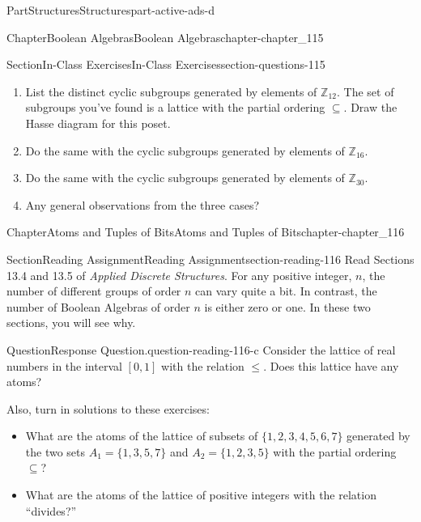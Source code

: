 \documentclass[oneside,10pt,]{book}
\numberwithin{equation}{section}
\begin{document}
\begin{partptx}{Part}{Structures}{}{Structures}{}{}{part-active-ads-d}
\begin{chapterptx}{Chapter}{Boolean Algebras}{}{Boolean Algebras}{}{}{chapter-chapter_115}
\begin{sectionptx}{Section}{In-Class Exercises}{}{In-Class Exercises}{}{}{section-questions-115}
\begin{enumerate}[label=\arabic*.]
\par
%
\begin{enumerate}
\item{}List the distinct cyclic subgroups generated by elements of \(\mathbb{Z}_{12}\). The set of subgroups you've found is a lattice with the partial ordering \(\subseteq\). Draw the Hasse diagram for this poset.%
\item{}Do the same with the cyclic subgroups generated by elements of \(\mathbb{Z}_{16}\).%
\item{}Do the same with the cyclic subgroups generated by elements of \(\mathbb{Z}_{30}\).%
\item{}Any general observations from the three cases?%
\end{enumerate}
%
\end{enumerate}
%
\end{sectionptx}
\end{chapterptx}
%
\typeout{************************************************}
\typeout{************************************************}
%
\begin{chapterptx}{Chapter}{Atoms and Tuples of Bits}{}{Atoms and Tuples of Bits}{}{}{chapter-chapter_116}
\renewcommand*{\chaptername}{Chapter}
%
%
%
\typeout{************************************************}
\typeout{************************************************}
%
\begin{sectionptx}{Section}{Reading Assignment}{}{Reading Assignment}{}{}{section-reading-116}
Read Sections 13.4 and 13.5 of \emph{Applied Discrete Structures}. For any positive integer, \(n\), the number of different groups of order  \(n\) can vary quite a bit. In contrast, the number of Boolean Algebras of order  \(n\) is either zero or one. In these two sections, you will see why.%
\begin{question}{Question}{Response Question.}{question-reading-116-c}%
Consider the lattice of real numbers in the interval \([0,1]\) with the relation \(\leq\).  Does this lattice have any atoms?%
\end{question}
Also, turn in solutions to these exercises:%
\begin{itemize}[label=\textbullet]
\item{}What are the atoms of the lattice of subsets of \(\{1, 2, 3, 4, 5, 6, 7\}\)  generated by the two sets \(A_1=\{1,3,5,7\}\) and \(A_2=\{1,2,3,5\}\) with the partial ordering \(\subseteq\)?%
\item{}What are the atoms of the lattice of positive integers with the relation ``divides?''%

\end{itemize}
\end{sectionptx}
\end{chapterptx}
\end{partptx}
\end{document}
